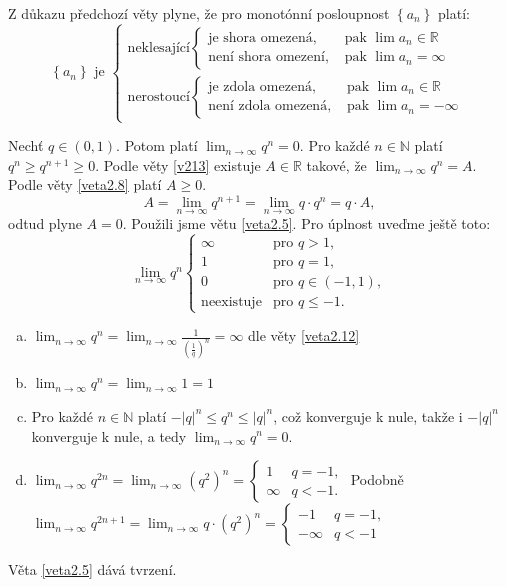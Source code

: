 \begin{poznamka}
	Z důkazu předchozí věty plyne, že pro monotónní posloupnost $\left \{ a_n \right \} $ platí:
	$$
	    \left \{  a_n \right \} \textrm{ je } \begin{cases}
			\textrm{neklesající} \begin{cases}
				\textrm{je shora omezená, } & \textrm{pak } \lim a_n \in \mathbb R  \\
				\textrm{není shora omezení, } & \textrm{pak }\lim a_n = \infty
			\end{cases}\\
			\textrm{nerostoucí} \begin{cases}
				\textrm{je zdola omezená, }& \textrm{pak }\lim a_n \in \mathbb R\\
				\textrm{není zdola omezená, }& \textrm{pak }\lim a_n = -\infty
			\end{cases}
		\end{cases}
	$$
\end{poznamka}

\begin{priklad}
	Nechť $q\in (0,1)$. Potom platí $\lim_{n\to \infty} q^n = 0.$ Pro každé $n\in \mathbb N $ platí
	$q^n \geq q^{n+1}\geq 0$. Podle věty \ref{v213} existuje $A\in \mathbb R $ takové, že
	$\lim_{n\to \infty} q^n=A$. Podle věty \ref{veta2.8}
	platí $A\geq 0$.
	$$
	    A= \lim_{n\to\infty} q^{n+1} = \lim_{n\to\infty} q\cdot q^n = q\cdot A,
	$$
	odtud plyne $A=0$. Použili jsme větu \ref{veta2.5}.
	Pro úplnost uveďme ještě toto:
	$$
	    \lim_{n\to\infty} q^n \begin{cases}
			\infty & \textrm{pro } q >1, \\
			1 & \textrm{pro } q =1, \\
			0 & \textrm{pro } q \in (-1,1), \\
			\textrm{neexistuje} & \textrm{pro } q \leq -1.
		\end{cases}
	$$
	\begin{enumerate}[(a)]
		\item $\lim_{n \to \infty} q^n = \lim_{n \to \infty} \frac{1}{\left( \frac{1}{q} \right )^n } = \infty$ dle věty \ref{veta2.12}
		\item $\lim_{n \to \infty} q^n = \lim_{n \to \infty} 1=1$
		\item Pro každé $n\in \mathbb N $ platí $- |q|^n\leq q^n \leq |q|^n$, což konverguje k nule, takže i
		$- |q|^n$ konverguje k nule, a tedy $\lim_{n \to \infty} q^n = 0.$
		\item $\lim_{n \to \infty} q^{2n}=\lim_{n \to \infty} \left( q^2 \right )^n = \begin{cases}
			1 & q = -1,\\
			\infty & q < -1.
		\end{cases} $ Podobně $\lim_{n \to \infty} q^{2n+1} = \lim_{n \to \infty} q\cdot \left( q^2 \right )^n = \begin{cases}
			-1 & q = -1,\\
			-\infty & q < -1
		\end{cases}$
	\end{enumerate}
	Věta \ref{veta2.5} dává tvrzení.
\end{priklad}


